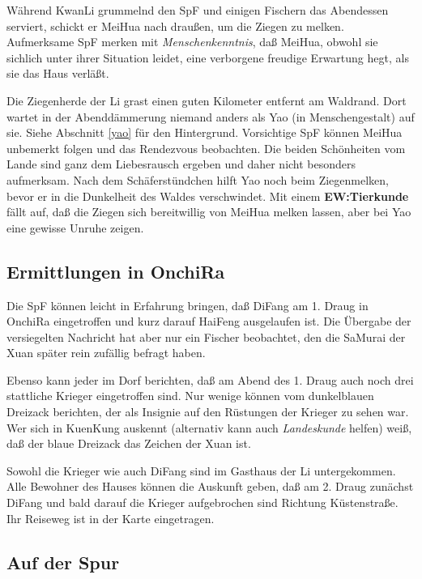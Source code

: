 \documentclass[
a4paper,
twoside,
DIV=calc,
BCOR=4mm,
fontsize=9pt,
twocolumn=on,
titlepage=on,
parskip=half
]{scrartcl}
\begin{document}
Während KwanLi grummelnd den SpF und einigen Fischern das Abendessen
serviert, schickt er MeiHua nach draußen, um die Ziegen zu
melken. Aufmerksame SpF merken mit \emph{Menschenkenntnis}, daß
MeiHua, obwohl sie sichlich unter ihrer Situation leidet, eine
verborgene freudige Erwartung hegt, als sie das Haus verläßt.

Die Ziegenherde der Li grast einen guten Kilometer entfernt am
Waldrand. Dort wartet in der Abenddämmerung niemand anders als Yao (in
Menschengestalt) auf sie. Siehe Abschnitt \ref{yao} für den
Hintergrund. Vorsichtige SpF können MeiHua unbemerkt folgen und das
Rendezvous beobachten. Die beiden Schönheiten vom Lande sind ganz dem
Liebesrausch ergeben und daher nicht besonders aufmerksam. Nach dem
Schäferstündchen hilft Yao noch beim Ziegenmelken, bevor er in die
Dunkelheit des Waldes verschwindet. Mit einem \textbf{EW:Tierkunde}
fällt auf, daß die Ziegen sich bereitwillig von MeiHua melken
lassen, aber bei Yao eine gewisse Unruhe zeigen.

\subsection{Ermittlungen in OnchiRa}

Die SpF können leicht in Erfahrung bringen, daß DiFang am 1. Draug in
OnchiRa eingetroffen und kurz darauf HaiFeng ausgelaufen ist. Die
Übergabe der versiegelten Nachricht hat aber nur ein Fischer
beobachtet, den die SaMurai der Xuan später rein zufällig befragt
haben.

Ebenso kann jeder im Dorf berichten, daß am Abend des 1. Draug auch
noch drei stattliche Krieger eingetroffen sind. Nur wenige können vom
dunkelblauen Dreizack berichten, der als Insignie auf den Rüstungen
der Krieger zu sehen war. Wer sich in KuenKung auskennt (alternativ
kann auch \emph{Landeskunde} helfen) weiß, daß der blaue Dreizack das
Zeichen der Xuan ist.

Sowohl die Krieger wie auch DiFang sind im Gasthaus der Li
untergekommen. Alle Bewohner des Hauses können die Auskunft geben, daß
am 2. Draug zunächst DiFang und bald darauf die Krieger aufgebrochen
sind Richtung Küstenstraße. Ihr Reiseweg ist in der Karte eingetragen.

\subsection{Auf der Spur}
\end{document}

